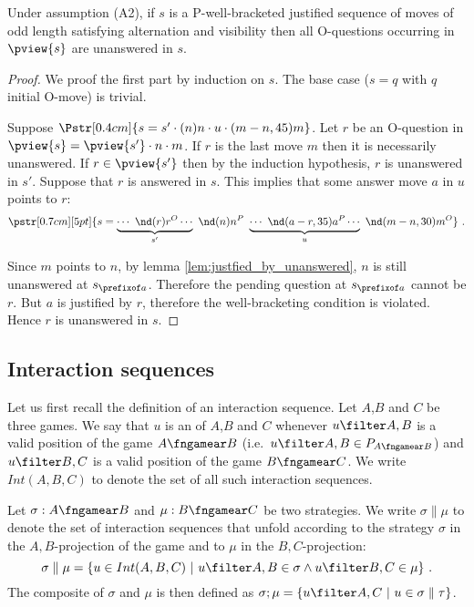 \begin{lemma}
\label{lem:oq_in_pview_unanswered}
Under assumption (A2), if $s$ is a P-well-bracketed justified sequence of moves of odd length satisfying alternation and visibility then  all O-questions occurring in $\pview{s}$ are unanswered in $s$.
\end{lemma}
\begin{proof}
We proof the first part by induction on $s$.
The base case ($s = q$ with $q$ initial O-move) is trivial.

Suppose $\Pstr[0.4cm]{ s = s' \cdot (n)n \cdot u \cdot (m-n,45){m} }$.
Let $r$ be an O-question in $\pview{s} = \pview{s'} \cdot n \cdot m$.
If $r$ is the last move $m$ then it is necessarily unanswered.
If $r \in \pview{s'}$ then by the induction hypothesis, $r$ is unanswered in $s'$.
Suppose that $r$ is answered in $s$. This implies that some answer move $a$ in $u$ points to $r$:
$$\pstr[0.7cm][5pt]{ s = \underbrace{\cdots\ \nd(r){r}^O \cdots }_{s'} \
\nd(n){n}^P \ \underbrace{\cdots\ \nd(a-r,35){a}^P \cdots }_{u} \
\nd(m-n,30){m}^O } \ .$$

Since $m$ points to $n$, by lemma \ref{lem:justfied_by_unanswered}, $n$ is still unanswered at $s_{\prefixof a}$. Therefore the pending
question at $s_{\prefixof a}$ cannot be $r$. But $a$ is justified by $r$, therefore the well-bracketing condition is violated. Hence $r$ is
unanswered in $s$.
\end{proof}








\subsection{Interaction sequences} Let us first recall the
definition of an interaction sequence. Let $A$,$B$ and $C$ be three
games. We say that $u$  is an
\defname{interaction sequence} of $A$,$B$ and $C$ whenever $u\filter
A,B$ is a valid position of the game $A\fngamear B$ (i.e.~$u\filter
A,B \in P_{A\fngamear B}$) and  $u\filter B,C$ is a valid position
of the game $B\fngamear C$. We write $Int(A,B,C)$ to denote the set
of all such interaction sequences.

Let $\sigma:A\fngamear B$ and $\mu:B\fngamear C$ be two strategies.
We write $\sigma \parallel \mu$ to denote the set of interaction
sequences that unfold according to the strategy $\sigma$ in the
$A,B$-projection of the game and to $\mu$ in the $B,C$-projection:
$$ \sigma \parallel \mu = \{ u \in Int(A,B,C) \ | \ u\filter A,B \in \sigma \wedge u \filter B,C \in \mu \} \ .$$
The composite of $\sigma$ and $\mu$ is then defined as $\sigma ; \mu
= \{ u \filter A,C \ | \ u \in \sigma \parallel \tau \}$.

